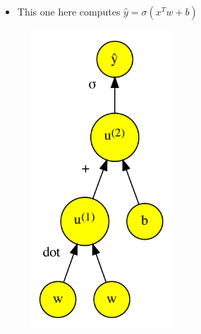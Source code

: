 \documentclass[t]{beamer}
\begin{document}
\begin{frame}
    \begin{figure}
        \centering
        \begin{minipage}{0.45\textwidth}
            \begin{itemize}
                \item This one here computes \(\hat{y} = \sigma (x^T w + b)\)
            \end{itemize}
        \end{minipage}\hfill
        \begin{minipage}{0.45\textwidth}
            \centering
            \begin{figure}[]
                \includegraphics[width=0.6\textwidth]{../plots/computational-graph-b-crop.pdf}
            \end{figure}
        \end{minipage}
    \end{figure}
\end{frame}
\end{document}
